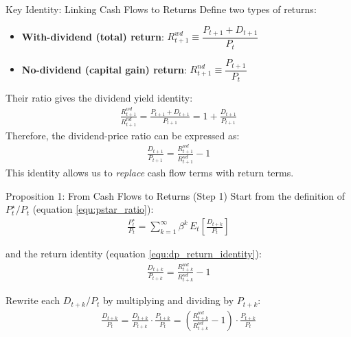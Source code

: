 \documentclass{beamer}
\begin{document}
\begin{frame}{Key Identity: Linking Cash Flows to Returns}
	Define two types of returns:
	\begin{itemize}
		\item \textbf{With-dividend (total) return}: $R_{t+1}^{wd} \equiv \dfrac{P_{t+1} + D_{t+1}}{P_t}$
		\item \textbf{No-dividend (capital gain) return}: $R_{t+1}^{nd} \equiv \dfrac{P_{t+1}}{P_t}$
	\end{itemize}

	\vspace{5pt}
	Their ratio gives the dividend yield identity:
	\begin{align}
		\frac{R_{t+1}^{wd}}{R_{t+1}^{nd}} = \frac{P_{t+1} + D_{t+1}}{P_{t+1}} = 1 + \frac{D_{t+1}}{P_{t+1}}
	\end{align}
	Therefore, the dividend-price ratio can be expressed as:
	\begin{align}
		\frac{D_{t+1}}{P_{t+1}} = \frac{R_{t+1}^{wd}}{R_{t+1}^{nd}} - 1 \label{equ:dp_return_identity}
	\end{align}
	This identity allows us to \textit{replace} cash flow terms with return terms.
\end{frame}

\begin{frame}{Proposition 1: From Cash Flows to Returns (Step 1)}
	Start from the definition of $P_t^\star / P_t$ (equation \ref{equ:pstar_ratio}):
	\begin{align*}
		\frac{P_t^\star}{P_t} = \sum_{k=1}^{\infty} \beta^k \, E_t\!\left[\frac{D_{t+k}}{P_t}\right]
	\end{align*}

	and the return identity (equation \ref{equ:dp_return_identity}):
	\begin{align*}
		\frac{D_{t+k}}{P_{t+k}} = \frac{R_{t+k}^{wd}}{R_{t+k}^{nd}} - 1
	\end{align*}

	Rewrite each $D_{t+k}/P_t$ by multiplying and dividing by $P_{t+k}$:
	\begin{align*}
		\frac{D_{t+k}}{P_t} = \frac{D_{t+k}}{P_{t+k}} \cdot \frac{P_{t+k}}{P_t} = \left(\frac{R_{t+k}^{wd}}{R_{t+k}^{nd}} - 1\right) \cdot \frac{P_{t+k}}{P_t}
	\end{align*}
\end{frame}
\end{document}
